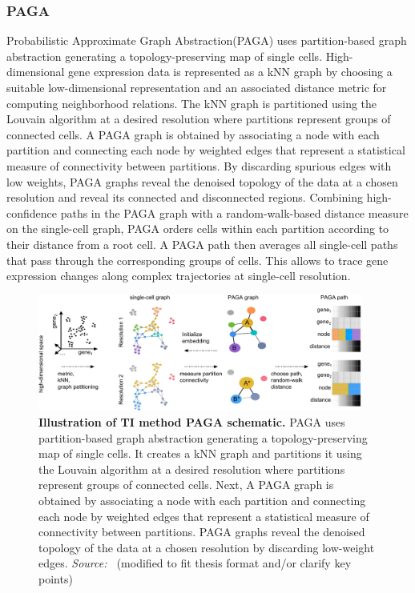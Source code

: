 \subsubsection{PAGA} 
Probabilistic Approximate Graph Abstraction(PAGA) uses partition-based graph abstraction generating a topology-preserving map of single cells\citep{wolf2019paga}. High-dimensional gene expression data is represented as a kNN graph by choosing a suitable low-dimensional representation and an associated distance metric for computing neighborhood relations. The kNN graph is partitioned using the Louvain algorithm at a desired resolution where partitions represent groups of connected cells. A PAGA graph is obtained by associating a node with each partition and connecting each node by weighted edges that represent a statistical measure of connectivity between partitions. By discarding spurious edges with low weights, PAGA graphs reveal the denoised topology of the data at a chosen resolution and reveal its connected and disconnected regions. Combining high-confidence paths in the PAGA graph with a random-walk-based distance measure on the single-cell graph, PAGA orders cells within each partition according to their distance from a root cell. A PAGA path then averages all single-cell paths that pass through the corresponding groups of cells. This allows to trace gene expression changes along complex trajectories at single-cell resolution.
\begin{figure}[ht!]
	\centering
	\includegraphics[width=0.95\textwidth]{TI_Alg_PAGA/fig}
	\vspace{0.1cm}
	\caption[Illustration of TI method PAGA schematic.]{\textbf{Illustration of TI method PAGA schematic.} 
	PAGA uses partition-based graph abstraction generating a topology-preserving map of single cells. It creates a kNN graph and partitions it using the Louvain algorithm at a desired resolution where partitions represent groups of connected cells. Next, A PAGA graph is obtained by associating a node with each partition and connecting each node by weighted edges that represent a statistical measure of connectivity between partitions. PAGA graphs reveal the denoised topology of the data at a chosen resolution by discarding low-weight edges. \emph{Source: ~\cite{wolf2019paga}}(modified to fit thesis format and/or clarify key points)
	}
	\label{fig:TI_Alg_PAGA}
\end{figure}


